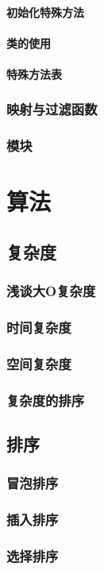 \documentclass{book}
\begin{document}
\subsection{初始化特殊方法}
\subsection{类的使用}
\subsection{特殊方法表}
\section{映射与过滤函数}
\section{模块}
\part{算法}
\chapter{复杂度}
\section{浅谈大O复杂度}
\section{时间复杂度}
\section{空间复杂度}
\section{复杂度的排序}
\chapter{排序}
\section{冒泡排序}
\section{插入排序}
\section{选择排序}
\end{document}
